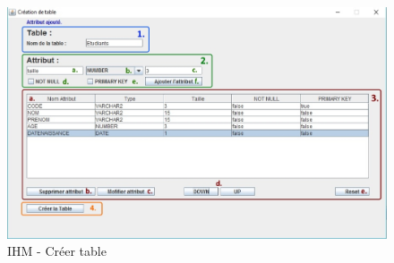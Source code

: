 \begin{figure}[!h]
\centering
\includegraphics[width=14cm]{./images/manuel/creer_table.eps}
\caption{IHM - Créer table}
\label{creer_table_gui}
\end{figure}

